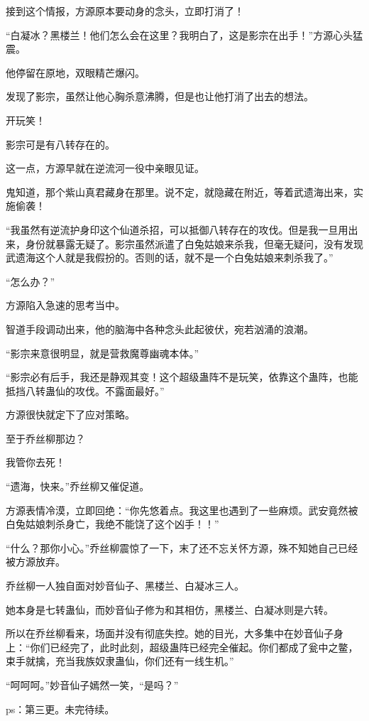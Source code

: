 \begin{this_body}
接到这个情报，方源原本要动身的念头，立即打消了！

“白凝冰？黑楼兰！他们怎么会在这里？我明白了，这是影宗在出手！”方源心头猛震。

他停留在原地，双眼精芒爆闪。

发现了影宗，虽然让他心胸杀意沸腾，但是也让他打消了出去的想法。

开玩笑！

影宗可是有八转存在的。

这一点，方源早就在逆流河一役中亲眼见证。

鬼知道，那个紫山真君藏身在那里。说不定，就隐藏在附近，等着武遗海出来，实施偷袭！

“我虽然有逆流护身印这个仙道杀招，可以抵御八转存在的攻伐。但是我一旦用出来，身份就暴露无疑了。影宗虽然派遣了白兔姑娘来杀我，但毫无疑问，没有发现武遗海这个人就是我假扮的。否则的话，就不是一个白兔姑娘来刺杀我了。”

“怎么办？”

方源陷入急速的思考当中。

智道手段调动出来，他的脑海中各种念头此起彼伏，宛若汹涌的浪潮。

“影宗来意很明显，就是营救魔尊幽魂本体。”

“影宗必有后手，我还是静观其变！这个超级蛊阵不是玩笑，依靠这个蛊阵，也能抵挡八转蛊仙的攻伐。不露面最好。”

方源很快就定下了应对策略。

至于乔丝柳那边？

我管你去死！

“遗海，快来。”乔丝柳又催促道。

方源表情冷漠，立即回绝：“你先悠着点。我这里也遇到了一些麻烦。武安竟然被白兔姑娘刺杀身亡，我绝不能饶了这个凶手！！”

“什么？那你小心。”乔丝柳震惊了一下，末了还不忘关怀方源，殊不知她自己已经被方源放弃。

乔丝柳一人独自面对妙音仙子、黑楼兰、白凝冰三人。

她本身是七转蛊仙，而妙音仙子修为和其相仿，黑楼兰、白凝冰则是六转。

所以在乔丝柳看来，场面并没有彻底失控。她的目光，大多集中在妙音仙子身上：“你们已经完了，此时此刻，超级蛊阵已经完全催起。你们都成了瓮中之鳖，束手就擒，充当我族奴隶蛊仙，你们还有一线生机。”

“呵呵呵。”妙音仙子嫣然一笑，“是吗？”

ps：第三更。未完待续。

\end{this_body}

